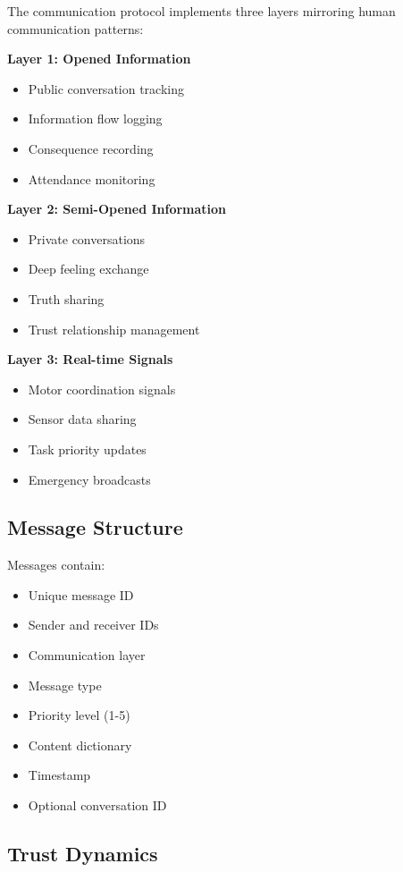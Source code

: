 \documentclass[12pt,a4paper]{article}
\begin{document}
\begin{itemize}
The communication protocol implements three layers mirroring human communication patterns:

\textbf{Layer 1: Opened Information}
\begin{itemize}
    \item Public conversation tracking
    \item Information flow logging
    \item Consequence recording
    \item Attendance monitoring
\end{itemize}

\textbf{Layer 2: Semi-Opened Information}
\begin{itemize}
    \item Private conversations
    \item Deep feeling exchange
    \item Truth sharing
    \item Trust relationship management
\end{itemize}

\textbf{Layer 3: Real-time Signals}
\begin{itemize}
    \item Motor coordination signals
    \item Sensor data sharing
    \item Task priority updates
    \item Emergency broadcasts
\end{itemize}

\subsection{Message Structure}

Messages contain:
\begin{itemize}
    \item Unique message ID
    \item Sender and receiver IDs
    \item Communication layer
    \item Message type
    \item Priority level (1-5)
    \item Content dictionary
    \item Timestamp
    \item Optional conversation ID
\end{itemize}

\subsection{Trust Dynamics}


\end{itemize}
\end{document}
